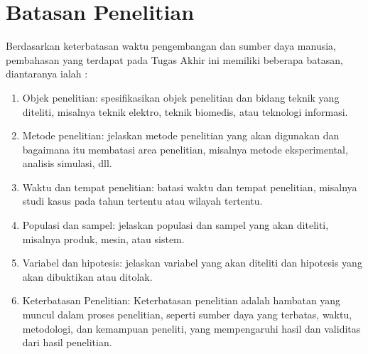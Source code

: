 \section{Batasan Penelitian}
Berdasarkan keterbatasan waktu pengembangan dan sumber daya manusia, pembahasan yang terdapat pada Tugas Akhir ini memiliki beberapa batasan, diantaranya ialah :
\begin{enumerate}
\item Objek penelitian: spesifikasikan objek penelitian dan bidang teknik yang diteliti, misalnya teknik elektro, teknik biomedis, atau teknologi informasi.
\item Metode penelitian: jelaskan metode penelitian yang akan digunakan dan 
bagaimana itu membatasi area penelitian, misalnya metode eksperimental, 
analisis simulasi, dll.
\item Waktu dan tempat penelitian: batasi waktu dan tempat penelitian, 
misalnya studi kasus pada tahun tertentu atau wilayah tertentu.
\item Populasi dan sampel: jelaskan populasi dan sampel yang akan diteliti, misalnya produk, mesin, atau sistem.
\item Variabel dan hipotesis: jelaskan variabel yang akan diteliti dan hipotesis yang akan dibuktikan atau ditolak.
\item Keterbatasan Penelitian: Keterbatasan penelitian adalah hambatan yang muncul dalam proses penelitian, seperti sumber daya yang terbatas, waktu, metodologi, dan kemampuan peneliti, yang mempengaruhi hasil dan validitas dari hasil penelitian.
\end{enumerate}

